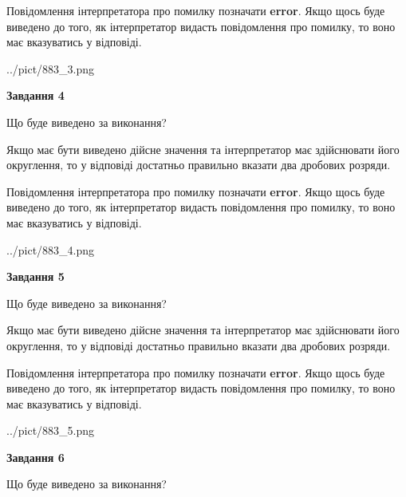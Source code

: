 \documentclass[12pt, ukrainian]{article}
\begin{document}
{\begin {Large}
Повідомлення інтерпретатора про помилку позначати \textbf{error}.
Якщо щось буде виведено до того, як інтерпретатор видасть повідомлення про помилку, 
то воно має вказуватись у відповіді. \par

\begin{center}
	{../pict/883_3.png}
\end{center}
\newpage

{\begin {center}\textbf{Завдання 4}\end {center}}\par
Що буде виведено за виконання? \par

Якщо має бути виведено дійсне значення та інтерпретатор має здійснювати його округлення, 
то у відповіді достатньо правильно вказати два дробових розряди.

Повідомлення інтерпретатора про помилку позначати \textbf{error}.
Якщо щось буде виведено до того, як інтерпретатор видасть повідомлення про помилку, 
то воно має вказуватись у відповіді. \par

\begin{center}
	{../pict/883_4.png}
\end{center}
\newpage

{\begin {center}\textbf{Завдання 5}\end {center}}\par
Що буде виведено за виконання? \par

Якщо має бути виведено дійсне значення та інтерпретатор має здійснювати його округлення, 
то у відповіді достатньо правильно вказати два дробових розряди.

Повідомлення інтерпретатора про помилку позначати \textbf{error}.
Якщо щось буде виведено до того, як інтерпретатор видасть повідомлення про помилку, 
то воно має вказуватись у відповіді. \par

\begin{center}
	{../pict/883_5.png}
\end{center}
\newpage

{\begin {center}\textbf{Завдання 6}\end {center}}\par
Що буде виведено за виконання? \par


\end{Large}}
\end{document}
